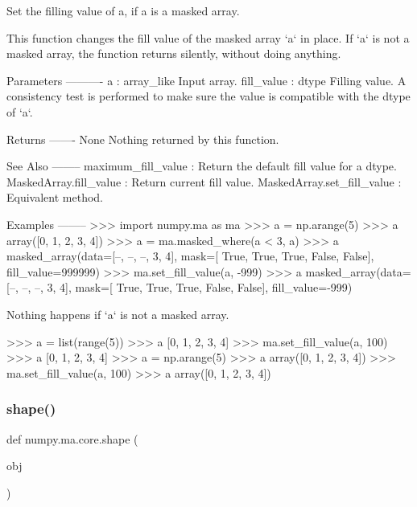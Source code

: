 \begin{DoxyVerb}Set the filling value of a, if a is a masked array.

This function changes the fill value of the masked array `a` in place.
If `a` is not a masked array, the function returns silently, without
doing anything.

Parameters
----------
a : array_like
    Input array.
fill_value : dtype
    Filling value. A consistency test is performed to make sure
    the value is compatible with the dtype of `a`.

Returns
-------
None
    Nothing returned by this function.

See Also
--------
maximum_fill_value : Return the default fill value for a dtype.
MaskedArray.fill_value : Return current fill value.
MaskedArray.set_fill_value : Equivalent method.

Examples
--------
>>> import numpy.ma as ma
>>> a = np.arange(5)
>>> a
array([0, 1, 2, 3, 4])
>>> a = ma.masked_where(a < 3, a)
>>> a
masked_array(data=[--, --, --, 3, 4],
             mask=[ True,  True,  True, False, False],
       fill_value=999999)
>>> ma.set_fill_value(a, -999)
>>> a
masked_array(data=[--, --, --, 3, 4],
             mask=[ True,  True,  True, False, False],
       fill_value=-999)

Nothing happens if `a` is not a masked array.

>>> a = list(range(5))
>>> a
[0, 1, 2, 3, 4]
>>> ma.set_fill_value(a, 100)
>>> a
[0, 1, 2, 3, 4]
>>> a = np.arange(5)
>>> a
array([0, 1, 2, 3, 4])
>>> ma.set_fill_value(a, 100)
>>> a
array([0, 1, 2, 3, 4])\end{DoxyVerb}
 \mbox{\label{namespacenumpy_1_1ma_1_1core_adfb120ad3d95b1520434ad69cafaf5d7}} 
\subsubsection{\texorpdfstring{shape()}{shape()}}
{\footnotesize\ttfamily def numpy.\+ma.\+core.\+shape (\begin{DoxyParamCaption}\item[{}]{obj }\end{DoxyParamCaption})}

\mbox{\label{namespacenumpy_1_1ma_1_1core_a899665726a2025e35f4adfaba5916272}} 
